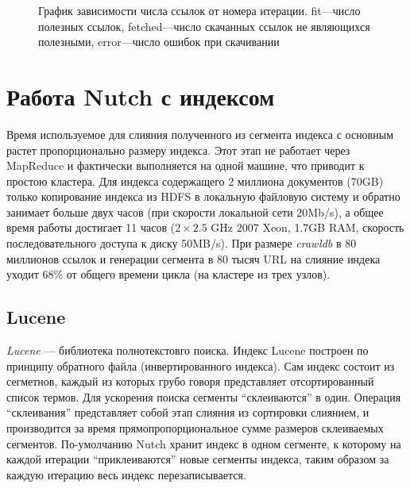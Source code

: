 \begin{figure}[h!]
 \caption{График зависимости числа ссылок от номера итерации. fit---число полезных ссылок, fetched---число скачанных ссылок не являющихся полезными, error---число ошибок при скачивании}
 \label{ris:score}
\end{figure}

\section{Работа Nutch с индексом}
Время используемое для слияния полученного из сегмента индекса с основным растет пропорционально размеру индекса. Этот этап не работает через MapReduce и фактически выполняется на одной машине, что приводит к простою кластера. Для индекса содержащего 2 миллиона документов (70GB) только копирование индекса из HDFS в локальную файловую систему и обратно занимает больше двух часов (при скорости локальной сети 20Mb/s), а общее время работы достигает 11 часов ($2\times2.5$ GHz 2007 Xeon, 1.7GB RAM, скорость последовательного доступа к диску 50MB/s). При размере \textit{crawldb} в 80 миллионов ссылок и генерации сегмента в 80 тысяч URL на слияние индека уходит 68\% от общего времени цикла (на кластере из трех узлов).
\subsection{Lucene}
\textit{Lucene} --- библиотека полнотекстовго поиска. Индекс Lucene построен по принципу обратного файла (инвертированного индекса). Сам индекс состоит из сегметнов, каждый из которых грубо говоря представляет отсортированный список термов. Для ускорения поиска сегменты ``склеиваются'' в один. Операция ``склеивания'' представляет собой этап слияния из сортировки слиянием, и производится за время прямопропорциональное сумме размеров склеиваемых сегментов. По-умолчанию Nutch хранит индекс в одном сегменте, к которому на каждой итерации ``приклеиваются'' новые сегменты индекса, таким образом за каждую итерацию весь индекс перезаписывается.

